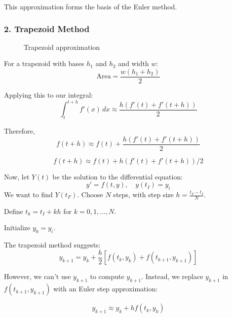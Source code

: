 \documentclass{article}
\begin{document}
This approximation forms the basis of the Euler method.

\subsubsection*{2. Trapezoid Method}

\begin{figure}[h]
    \centering
    \caption{Trapezoid approximation}
\end{figure}

For a trapezoid with bases $h_1$ and $h_2$ and width $w$:
\[
\text{Area} = \frac{w(h_1 + h_2)}{2}
\]

Applying this to our integral:
\[
\int_t^{t+h} f'(x) \, dx \approx \frac{h(f'(t) + f'(t+h))}{2}
\]

Therefore,
\[
f(t+h) \approx f(t) + \frac{h(f'(t) + f'(t+h))}{2}
\]

\[
f(t+h) \approx f(t) + h(f'(t) + f'(t+h))/2
\]

Now, let $Y(t)$ be the solution to the differential equation:
\[
y' = f(t,y), \quad y(t_I) = y_i
\]
We want to find $Y(t_F)$. Choose $N$ steps, with step size $h = \frac{t_F - t_I}{N}$.

Define $t_k = t_I + kh$ for $k = 0, 1, \ldots, N$.

Initialize $y_0 = y_i$.

The trapezoid method suggests:
\[
y_{k+1} = y_k + \frac{h}{2}[f(t_k, y_k) + f(t_{k+1}, y_{k+1})]
\]

However, we can't use $y_{k+1}$ to compute $y_{k+1}$. Instead, we replace $y_{k+1}$ in $f(t_{k+1}, y_{k+1})$ with an Euler step approximation:

\[
y_{k+1} \approx y_k + hf(t_k, y_k)
\]
\end{document}
